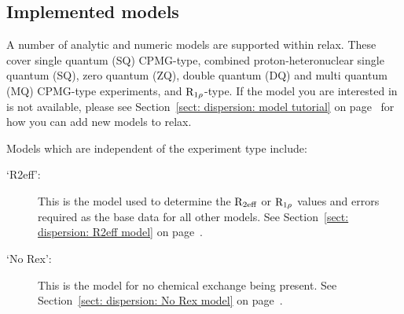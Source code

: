 
\subsection{Implemented models}
\label{sect: dispersion: implemented models}

A number of analytic and numeric models are supported within relax.
These cover single quantum (SQ) CPMG-type, combined proton-heteronuclear single quantum (SQ), zero quantum (ZQ), double quantum (DQ) and multi quantum (MQ) CPMG-type experiments, and $\mathrm{R}_{1\rho}$-type.
If the model you are interested in is not available, please see Section~\ref{sect: dispersion: model tutorial} on page~\pageref{sect: dispersion: model tutorial} for how you can add new models to relax.

Models which are independent of the experiment type include:
\begin{description}
  \item[`R2eff':]  This is the model used to determine the $\mathrm{R}_{\textrm{2eff}}$ or $\mathrm{R}_{1\rho}$ values and errors required as the base data for all other models.
    See Section~\ref{sect: dispersion: R2eff model} on page~\pageref{sect: dispersion: R2eff model}.
  \item[`No Rex':]  This is the model for no chemical exchange being present.
    See Section~\ref{sect: dispersion: No Rex model} on page~\pageref{sect: dispersion: No Rex model}.
\end{description}


